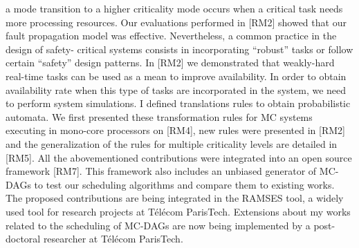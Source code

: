 \documentclass{article}
\begin{document}
a mode transition
to a higher criticality mode occurs when a critical task needs more processing resources. Our evaluations 
performed in
[RM2] showed that our fault propagation model was effective. Nevertheless, a common practice in the 
design of safety-
critical systems consists in incorporating “robust” tasks or follow certain “safety” design patterns. In [RM2] 
we demonstrated
that weakly-hard real-time tasks can be used as a mean to improve availability. In order to obtain availability 
rate when this
type of tasks are incorporated in the system, we need to perform system simulations. I defined translations 
rules to obtain
probabilistic automata. We first presented these transformation rules for MC systems executing in 
mono-core processors
on [RM4], new rules were presented in [RM2] and the generalization of the rules for multiple criticality 
levels are detailed in
[RM5].
All the abovementioned contributions were integrated into an open source framework [RM7]. This 
framework also includes
an unbiased generator of MC-DAGs to test our scheduling algorithms and compare them to existing works. 
The proposed
contributions are being integrated in the RAMSES tool, a widely used tool for research projects at Télécom 
ParisTech.
Extensions about my works related to the scheduling of MC-DAGs are now being implemented by a 
post-doctoral researcher
at Télécom ParisTech.
\end{document}
